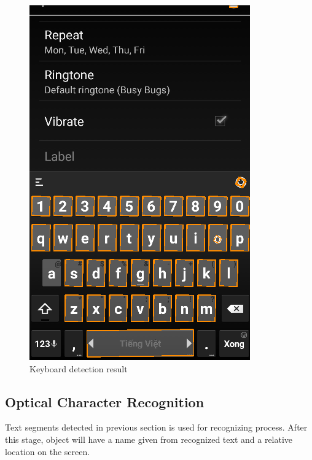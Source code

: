 	\begin{figure}[H]
		\centering
		\includegraphics[scale=0.5]{Chapters/Fig/kb_detect.png}
		\caption{Keyboard detection result}
		\label{fig:kb_detect}
	\end{figure}

\subsection{Optical Character Recognition}
Text segments detected in previous section is used for recognizing process. After this stage, object will have a name given from recognized text and a relative location on the screen.

